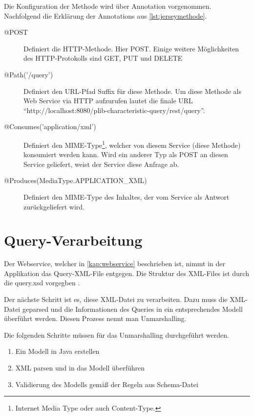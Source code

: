 Die Konfiguration der Methode wird über \Gls{Annotation} vorgenommen. Nachfolgend die Erklärung der \Glspl{Annotation} aus \autoref{lst:jerseymethode}.

\begin{description}
\item[@POST] Definiert die \gls{HTTP-Methode}. Hier \gls{POST}. Einige weitere Möglichkeiten des \gls{HTTP}-Protokolls sind GET, PUT und DELETE
\item[@Path('/query')] Definiert den URL-Pfad Suffix für diese Methode. Um diese Methode als Web Service via \gls{HTTP} aufzurufen lautet die finale URL \enquote{http://localhost:8080/plib-characteristic-query/rest/query}. 
\item[@Consumes('application/xml')] Definiert den \gls{MIME-Type}\footnote{Internet Media Type oder auch Content-Type.}, welcher von diesem Service (diese Methode) konsumiert werden kann. Wird ein anderer Typ als POST an diesen Service geliefert, weist der Service diese Anfrage ab. 
\item[@Produces(MediaType.APPLICATION\_XML)] Definiert den \gls{MIME-Type} des Inhaltes, der vom Service als Antwort zurückgeliefert wird.  
\end{description}

% 
\section{Query-Verarbeitung}

Der \gls{Webservice}, welcher in \autoref{kap:webservice} beschrieben ist, nimmt in der Applikation das Query-XML-File entgegen. 
Die Struktur des XML-Files ist durch die query.xsd vorgegben \citep[27]{iso29002-31}. 

Der nächste Schritt ist es, diese XML-Datei zu verarbeiten. Dazu muss die XML-Datei geparsed und die Informationen des Queries in ein entsprechendes Modell überführt werden. Diesen Prozess nennt man \gls{Unmarshalling}. 

Die folgenden Schritte müssen für das \gls{Unmarshalling} durchgeführt werden.

\begin{enumerate}
\item Ein Modell in Java erstellen
\item XML parsen und in das Modell überführen
\item Validierung des Modells gemäß der Regeln aus Schema-Datei
\end{enumerate}

